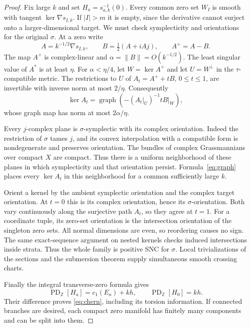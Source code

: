 \documentclass[11pt]{article}
\theoremstyle{definition}
\theoremstyle{remark}
\newcommand{\Z}{\mathbb Z}
\newcommand{\PD}{\operatorname{PD}_{\Z}}
\begin{document}
\begin{proof}
Fix large $k$ and set $H_a=s_{a,k}^{-1}(0)$. Every common zero set $W_I$ is smooth with tangent $\ker\nabla s_{I,k}$. If $|I|>m$ it is empty, since the derivative cannot surject onto a larger-dimensional target. We must check symplecticity and orientations for the original $\sigma$. At a zero write
\[
 A=k^{-1/2}\nabla s_{I,k},\qquad
 B=\tfrac12(A+iAj),\qquad A^+=A-B.
\]
The map $A^+$ is complex-linear and $\alpha=\|B\|=O(k^{-1/2})$. The least singular value of $A^*$ is at least $\eta$. For $\alpha<\eta/4$, let $W=\ker A^+$ and let $U=W^\perp$ in the $\tau$-compatible metric. The restrictions to $U$ of $A_t=A^++tB$, $0\leq t\leq1$, are invertible with inverse norm at most $2/\eta$. Consequently
\begin{equation}\label{eq:graph}
 \ker A_t=\operatorname{graph}\left(-\left(A_t|_U\right)^{-1}tB|_W\right),
\end{equation}
whose graph map has norm at most $2\alpha/\eta$.

Every $j$-complex plane is $\sigma$-symplectic with its complex orientation. Indeed the restriction of $\sigma$ tames $j$, and its convex interpolation with a compatible form is nondegenerate and preserves orientation. The bundles of complex Grassmannians over compact $X$ are compact. Thus there is a uniform neighborhood of these planes in which symplecticity and that orientation persist. Formula~\eqref{eq:graph} places every $\ker A_t$ in this neighborhood for a common sufficiently large $k$.

Orient a kernel by the ambient symplectic orientation and the complex target orientation. At $t=0$ this is its complex orientation, hence its $\sigma$-orientation. Both vary continuously along the surjective path $A_t$, so they agree at $t=1$. For a coordinate tuple, its zero-set orientation is the intersection orientation of the singleton zero sets. All normal dimensions are even, so reordering causes no sign. The same exact-sequence argument on nested kernels checks induced intersections inside strata. Thus the whole family is positive SNC for $\sigma$. Local trivializations of the sections and the submersion theorem supply simultaneous smooth crossing charts.

Finally the integral transverse-zero formula gives
\[
 \PD[H_a]=c_1(E_a)+kh,\qquad \PD[H_0]=kh.
\]
Their difference proves \eqref{eq:chern}, including its torsion information. If connected branches are desired, each compact zero manifold has finitely many components and can be split into them.
\end{proof}
\end{document}
